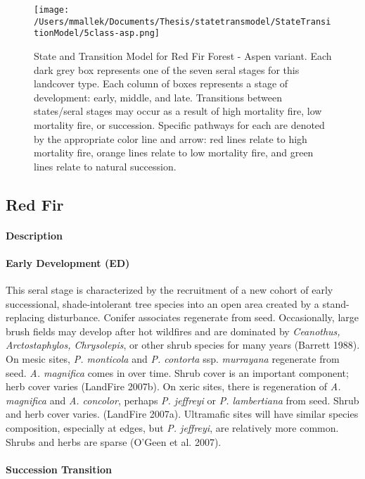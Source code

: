 \begin{figure}[htbp]
\centering
\texttt{[image: /Users/mmallek/Documents/Thesis/statetransmodel/StateTransitionModel/5class-asp.png]}
\caption{State and Transition Model for Red Fir Forest - Aspen variant. Each dark grey box represents one of the seven seral stages for this landcover type. Each column of boxes represents a stage of development: early, middle, and late. Transitions between states/seral stages may occur as a result of high mortality fire, low mortality fire, or succession. Specific pathways for each are denoted by the appropriate color line and arrow: red lines relate to high mortality fire, orange lines relate to low mortality fire, and green lines relate to natural succession.} 
\label{transmodel_rfr-asp}
\end{figure}

\subsection*{Red Fir}

\paragraph{Description}
\paragraph{Early Development (ED)} This seral stage is characterized by the recruitment of a new cohort of early successional, shade-intolerant tree species into an open area created by a stand-replacing disturbance. Conifer associates regenerate from seed. Occasionally, large brush fields may develop after hot wildfires and are dominated by \emph{Ceanothus, Arctostaphylos, Chrysolepis}, or other shrub species for many years (Barrett 1988). On mesic sites, \emph{P. monticola} and \emph{P. contorta} ssp. \emph{murrayana} regenerate from seed. \emph{A. magnifica} comes in over time. Shrub cover is an important component; herb cover varies (LandFire 2007b). On xeric sites, there is regeneration of \emph{A. magnifica} and \emph{A. concolor}, perhaps \emph{P. jeffreyi} or \emph{P. lambertiana} from seed. Shrub and herb cover varies. (LandFire 2007a). Ultramafic sites will have similar species composition, especially at edges, but \emph{P. jeffreyi}, are relatively more common. Shrubs and herbs are sparse (O'Geen et al. 2007).

\paragraph{Succession Transition}


